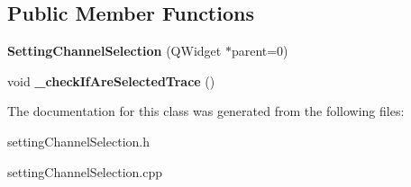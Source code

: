 \subsection*{Public Member Functions}
\begin{DoxyCompactItemize}
\item 
\mbox{\label{class_setting_channel_selection_a80d823bd31186c4b4413b1ae0904b5b9}} 
{\bfseries Setting\+Channel\+Selection} (Q\+Widget $\ast$parent=0)
\item 
\mbox{\label{class_setting_channel_selection_ae78dd0ff5a704d28a4b5d9e7822ccc39}} 
void {\bfseries \+\_\+check\+If\+Are\+Selected\+Trace} ()
\end{DoxyCompactItemize}


The documentation for this class was generated from the following files\+:\begin{DoxyCompactItemize}
\item 
setting\+Channel\+Selection.\+h\item 
setting\+Channel\+Selection.\+cpp\end{DoxyCompactItemize}
